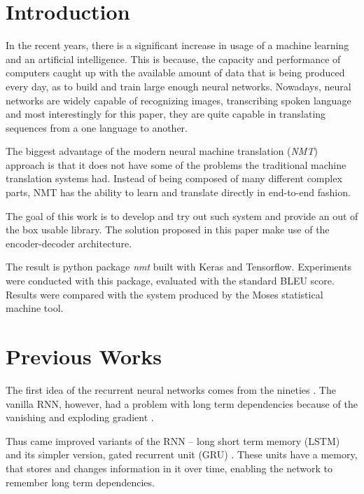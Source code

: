 \documentclass{ExcelAtFIT}
\affiliation{*%
  \href{mailto:xholcn01@stud.fit.vutbr.cz}{xholcn01@stud.fit.vutbr.cz},
  \textit{Faculty of Information Technology, Brno University of Technology}}
\begin{document}
\startdocument


\section{Introduction}
In the recent years, there is a significant increase in usage of a machine learning and an artificial intelligence. This is because, the capacity and performance of computers caught up with the available amount of data that is being produced every day, as to build and train large enough neural networks. Nowadays, neural networks are widely capable of recognizing images, transcribing spoken language and most interestingly for this paper, they are quite capable in translating sequences from a one language to another.

The biggest advantage of the modern neural machine translation (\emph{NMT}) approach is that it does not have some of the problems the traditional machine translation systems had. Instead of being composed of many different complex parts, NMT has the ability to learn and translate directly in end-to-end fashion.

The goal of this work is to develop and try out such system and provide an out of the box usable library. The solution proposed in this paper make use of the encoder-decoder architecture.

The result is python package \emph{nmt} built with Keras and Tensorflow. Experiments were conducted with this package, evaluated with the standard BLEU score. Results were compared with the system produced by the Moses \cite{Moses} statistical machine tool.


\section{Previous Works}
The first idea of the recurrent neural networks comes from the nineties \cite{rnn}. The vanilla RNN, however, had a problem with long term dependencies because of the vanishing and exploding gradient \cite{gradientProblems}.

Thus came improved variants of the RNN -- long short term memory (LSTM) \cite{LSTM, forgetLSTM} and its simpler version, gated recurrent unit (GRU) \cite{GRU}. These units have a memory, that stores and changes information in it over time, enabling the network to remember long term dependencies.
\end{document}
